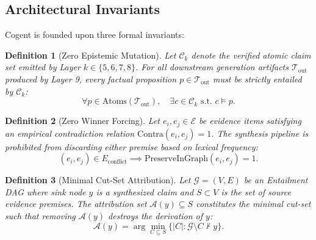 \documentclass[journal,compsoc]{IEEEtran}
\newtheorem{definition}{Definition}
\begin{document}
\subsection{Architectural Invariants}
Cogent is founded upon three formal invariants:
\begin{definition}[Zero Epistemic Mutation]
Let $\mathcal{C}_{k}$ denote the verified atomic claim set emitted by Layer $k \in \{5, 6, 7, 8\}$. For all downstream generation artifacts $\mathcal{T}_{\text{out}}$ produced by Layer 9, every factual proposition $p \in \mathcal{T}_{\text{out}}$ must be strictly entailed by $\mathcal{C}_k$:
\begin{equation}
\forall p \in \text{Atoms}(\mathcal{T}_{\text{out}}), \quad \exists c \in \mathcal{C}_k \text{ s.t. } c \models p.
\end{equation}
\end{definition}

\begin{definition}[Zero Winner Forcing]
Let $e_i, e_j \in \mathcal{E}$ be evidence items satisfying an empirical contradiction relation $\text{Contra}(e_i, e_j) = 1$. The synthesis pipeline is prohibited from discarding either premise based on lexical frequency:
\begin{equation}
(e_i, e_j) \in E_{\text{conflict}} \implies \text{PreserveInGraph}(e_i, e_j) = 1.
\end{equation}
\end{definition}

\begin{definition}[Minimal Cut-Set Attribution]
Let $\mathcal{G} = (V, E)$ be an Entailment DAG where sink node $y$ is a synthesized claim and $S \subset V$ is the set of source evidence premises. The attribution set $\mathcal{A}(y) \subseteq S$ constitutes the minimal cut-set such that removing $\mathcal{A}(y)$ destroys the derivation of $y$:
\begin{equation}
\mathcal{A}(y) = \arg\min_{C \subseteq S} \{|C| : \mathcal{G} \setminus C \not\vdash y\}.
\end{equation}
\end{definition}
\end{document}
